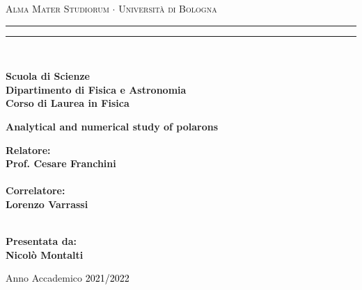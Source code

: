 \begin{titlepage}


    \begin{center}
        {{\Large{\textsc{Alma Mater Studiorum $\cdot$ Università di Bologna}}}}
        \rule[0.1cm]{15.8cm}{0.1mm}
        \rule[0.5cm]{15.8cm}{0.6mm}
        \\\vspace{3mm}

        {\small{\bf Scuola di Scienze \\
                Dipartimento di Fisica e Astronomia\\
                Corso di Laurea in Fisica}}

    \end{center}

    \vfill
    \vfill
    \centering
    \begin{center}%
        {\LARGE{\bf Analytical and numerical study of polarons}}\\
    \end{center}

    \vfill
    \vfill

    \begin{minipage}[t]{0.47\textwidth}
        {\large\bf Relatore:
            \vspace{2mm}\\
            \bf Prof. Cesare Franchini}     \\\\
        \large\bf Correlatore:
        \vspace{2mm}\\
        Lorenzo Varrassi\\\\
    \end{minipage}
    \hfill
    \begin{minipage}[t]{0.47\textwidth}\raggedleft
        {\large{\bf Presentata da:
                \\
                \vspace{2mm}
                Nicolò Montalti}}
    \end{minipage}

    \vfill

    \begin{center}
        Anno Accademico \textcolor{black}{2021/2022}
    \end{center}

\end{titlepage}
\restoregeometry